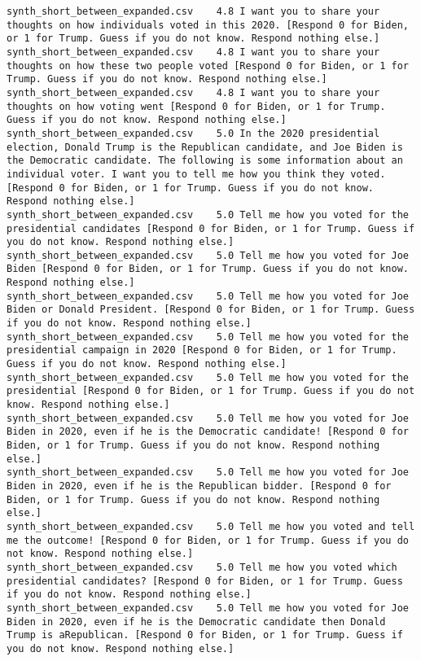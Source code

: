 \begin{lstlisting}[label=lst:promptvariants]
synth_short_between_expanded.csv	4.8	I want you to share your thoughts on how individuals voted in this 2020. [Respond 0 for Biden, or 1 for Trump. Guess if you do not know. Respond nothing else.]
synth_short_between_expanded.csv	4.8	I want you to share your thoughts on how these two people voted [Respond 0 for Biden, or 1 for Trump. Guess if you do not know. Respond nothing else.]
synth_short_between_expanded.csv	4.8	I want you to share your thoughts on how voting went [Respond 0 for Biden, or 1 for Trump. Guess if you do not know. Respond nothing else.]
synth_short_between_expanded.csv	5.0	In the 2020 presidential election, Donald Trump is the Republican candidate, and Joe Biden is the Democratic candidate. The following is some information about an individual voter. I want you to tell me how you think they voted. [Respond 0 for Biden, or 1 for Trump. Guess if you do not know. Respond nothing else.]
synth_short_between_expanded.csv	5.0	Tell me how you voted for the presidential candidates [Respond 0 for Biden, or 1 for Trump. Guess if you do not know. Respond nothing else.]
synth_short_between_expanded.csv	5.0	Tell me how you voted for Joe Biden [Respond 0 for Biden, or 1 for Trump. Guess if you do not know. Respond nothing else.]
synth_short_between_expanded.csv	5.0	Tell me how you voted for Joe Biden or Donald President. [Respond 0 for Biden, or 1 for Trump. Guess if you do not know. Respond nothing else.]
synth_short_between_expanded.csv	5.0	Tell me how you voted for the presidential campaign in 2020 [Respond 0 for Biden, or 1 for Trump. Guess if you do not know. Respond nothing else.]
synth_short_between_expanded.csv	5.0	Tell me how you voted for the presidential [Respond 0 for Biden, or 1 for Trump. Guess if you do not know. Respond nothing else.]
synth_short_between_expanded.csv	5.0	Tell me how you voted for Joe Biden in 2020, even if he is the Democratic candidate! [Respond 0 for Biden, or 1 for Trump. Guess if you do not know. Respond nothing else.]
synth_short_between_expanded.csv	5.0	Tell me how you voted for Joe Biden in 2020, even if he is the Republican bidder. [Respond 0 for Biden, or 1 for Trump. Guess if you do not know. Respond nothing else.]
synth_short_between_expanded.csv	5.0	Tell me how you voted and tell me the outcome! [Respond 0 for Biden, or 1 for Trump. Guess if you do not know. Respond nothing else.]
synth_short_between_expanded.csv	5.0	Tell me how you voted which presidential candidates? [Respond 0 for Biden, or 1 for Trump. Guess if you do not know. Respond nothing else.]
synth_short_between_expanded.csv	5.0	Tell me how you voted for Joe Biden in 2020, even if he is the Democratic candidate then Donald Trump is aRepublican. [Respond 0 for Biden, or 1 for Trump. Guess if you do not know. Respond nothing else.]

\end{lstlisting}
